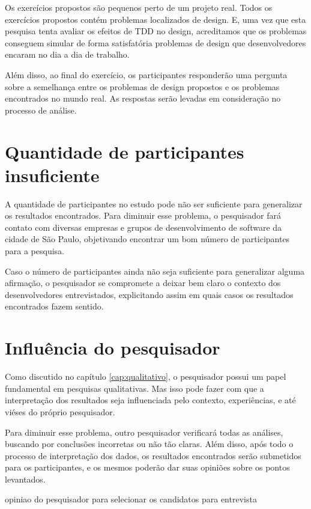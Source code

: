 Os exercícios propostos são pequenos perto de um projeto real. Todos os exercícios propostos contém
problemas localizados de design. E, uma vez que esta pesquisa tenta avaliar os efeitos de TDD no design, 
acreditamos que os problemas conseguem simular de forma satisfatória
problemas de design que desenvolvedores encaram no dia a dia de trabalho.

Além disso, ao final do exercício, os participantes responderão uma pergunta sobre a semelhança
entre os problemas de design propostos e os problemas encontrados no mundo real.
As respostas serão levadas em consideração no processo de análise.

\section{Quantidade de participantes insuficiente}

A quantidade de participantes no estudo pode não ser suficiente para generalizar
os resultados encontrados. Para diminuir esse problema, o pesquisador fará contato
com diversas empresas e grupos de desenvolvimento de software da cidade de São Paulo,
objetivando encontrar um bom número de participantes para a pesquisa.

Caso o número de participantes ainda não seja suficiente para generalizar alguma afirmação, 
o pesquisador se compromete a deixar bem claro o contexto dos desenvolvedores entrevistados,
explicitando assim em quais casos os resultados encontrados fazem sentido.

\section{Influência do pesquisador}

Como discutido no capítulo \ref{cap:qualitativo}, o pesquisador possui
um papel fundamental em pesquisas qualitativas. Mas isso pode fazer com que
a interpretação dos resultados seja influenciada pelo contexto, experiências,
e até viéses do próprio pesquisador.

Para diminuir esse problema, outro pesquisador verificará todas as análises,
buscando por conclusões incorretas ou não tão claras. Além disso, após todo o
processo de interpretação dos dados, os resultados encontrados serão submetidos
para os participantes, e os mesmos poderão dar suas opiniões sobre os pontos
levantados.




opiniao do pesquisador para selecionar os candidatos para entrevista